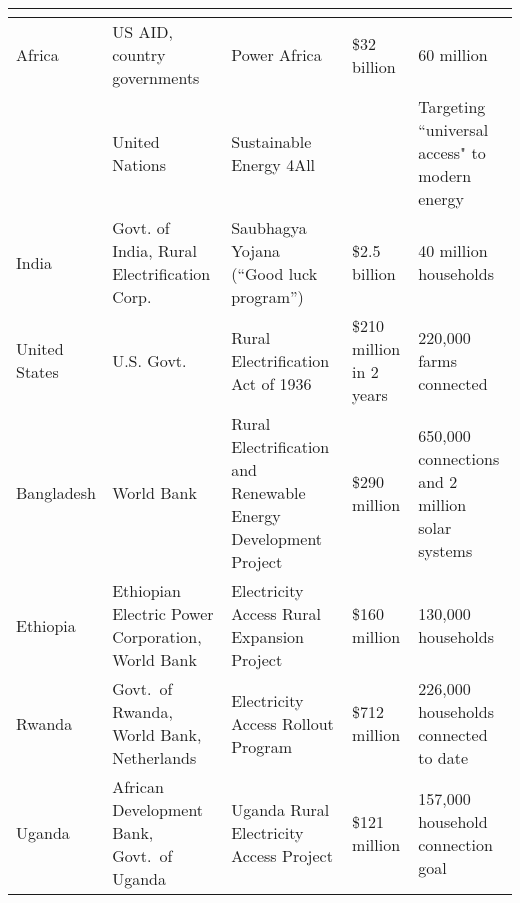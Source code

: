 \begin{tabular}{ P{2.2cm} P{4cm} P{4.25cm} P{1.5cm} P{3.5cm} }
\toprule
 \bf{}  & \bf{} &\bf{}&\bf{}&\bf{}\\
\toprule
Africa & US AID, country governments & Power Africa & \$32 billion & 60 million \\

 & United Nations & Sustainable Energy 4All & & Targeting ``universal access" to modern energy \\

India & Govt. of India, Rural Electrification Corp. & Saubhagya Yojana (``Good luck program'') & \$2.5 billion & 40 million households \\

United States & U.S. Govt. & Rural Electrification Act of 1936 & \$210 million in 2 years & 220,000 farms connected \\

 Bangladesh   & World Bank   &Rural Electrification and Renewable Energy Development Project & \$290 million  & 650,000 connections and 2 million solar systems\\


Ethiopia   &Ethiopian Electric Power Corporation, World Bank & Electricity Access Rural Expansion Project &  \$160 million & 130,000 households\\

Rwanda &   Govt.~of Rwanda, World Bank, Netherlands  & Electricity Access Rollout Program &\$712 million & 226,000 households connected to date\\

Uganda& African Development Bank, Govt.~of Uganda &Uganda Rural Electricity Access Project &\$121 million &157,000 household connection goal\\
\bottomrule
\end{tabular}
